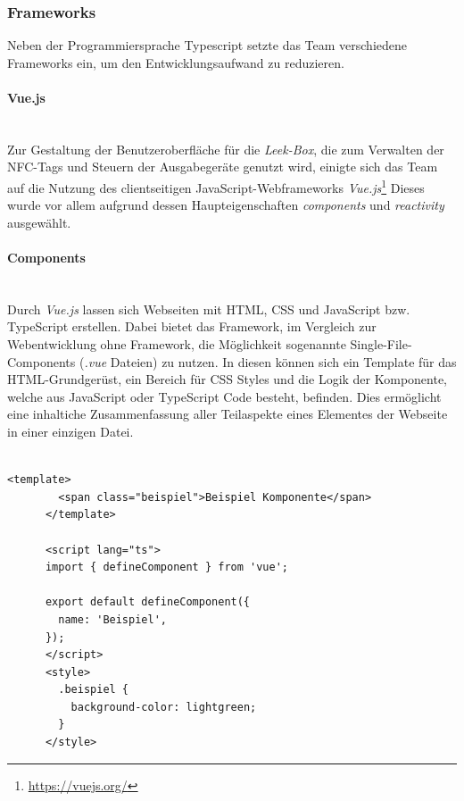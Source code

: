 \documentclass[10pt, a4paper]{article}
\begin{document}
\begin{onehalfspace}
  \subsubsection{Frameworks}
  Neben der Programmiersprache Typescript setzte das Team verschiedene Frameworks ein, um den Entwicklungsaufwand zu reduzieren.

  \paragraph*{Vue.js} $~$ \\
  Zur Gestaltung der Benutzeroberfläche für die \textit{Leek-Box}, die zum Verwalten der NFC-Tags und Steuern der Ausgabegeräte genutzt wird, einigte sich das Team auf die Nutzung des
  clientseitigen JavaScript-Webframeworks \textit{Vue.js}\footnote{\raggedright\url{https://vuejs.org/}}
  Dieses wurde vor allem aufgrund dessen Haupteigenschaften \textit{components} und \textit{reactivity} ausgewählt.

  \paragraph*{Components} $~$ \\
  Durch \textit{Vue.js} lassen sich Webseiten mit HTML, CSS und JavaScript bzw. TypeScript erstellen. Dabei bietet das Framework, im Vergleich zur Webentwicklung ohne Framework, die Möglichkeit sogenannte Single-File-Components (\textit{.vue} Dateien) zu nutzen. In diesen können sich ein Template für das HTML-Grundgerüst, ein Bereich für CSS Styles und die Logik der Komponente, welche aus JavaScript oder TypeScript Code besteht, befinden. Dies ermöglicht eine inhaltiche Zusammenfassung aller Teilaspekte eines Elementes der Webseite in einer einzigen Datei.
  \\~\\
  \begin{minipage}{\textwidth}
    \begin{lstlisting}[caption={Beispiel einer simplen \textit{vue component}-Datei}, captionpos=b, label=lst:EinfacheComponent]
      <template>
        <span class="beispiel">Beispiel Komponente</span>
      </template>

      <script lang="ts">
      import { defineComponent } from 'vue';

      export default defineComponent({
        name: 'Beispiel',
      });
      </script>
      <style>
        .beispiel {
          background-color: lightgreen;
        }
      </style>
    \end{lstlisting}
  \end{minipage}


\end{onehalfspace}
\end{document}
